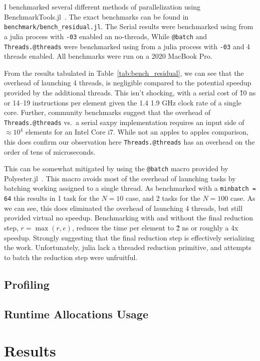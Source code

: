 \documentclass{article}
\begin{document}
I benchmarked several different methods of parallelization using BenchmarkTools.jl~\cite{BenchmarkTools.jl-2016}.
The exact benchmarks can be found in \verb!benchmark/bench_residual.jl!.
The Serial results were benchmarked using from a julia process with \verb!-03! enabled an no-threads, While \verb!@batch! and \verb!Threads.@threads! were benchmarked using from a julia process with \verb!-03! and 4 threads enabled.
All benchmarks were run on a 2020 MacBook Pro.

From the results tabulated in Table~\ref{tab:bench_residual}, we can see that the overhead of launching 4 threads, is negligible compared to the potential speedup provided by the additional threads.
This isn't shocking, with a serial cost of \~10 ns or 14--19 instructions per element given the 1.4 1.9 GHz clock rate of a single core.
Further, community benchmarks suggest that the overhead of \verb!Threads.@threads! vs.\ a serial saxpy implementation requires an input side of \(\approx 10^4\) elements for an Intel Core i7\cite{GccVsThreads2020}.
While not an apples to apples comparison, this does confirm our observation here \verb!Threads.@threads! has an overhead on the order of tens of microseconds.

This can be somewhat mitigated by using the \verb!@batch! macro provided by Polyester.jl~\cite{Polyester2022}.
This macro avoids most of the overhead of launching tasks by batching working assigned to a single thread.
As benchmarked with a \verb!minbatch = 64! this results in 1 task for the \(N = 10\) case, and 2 tasks for the \(N = 100\) case.
As we can see, this does eliminated the overhead of launching 4 threads, but still provided virtual no speedup.
Benchmarking with and without the final reduction step, \( r = \max(r, e) \), reduces the time per element to \~2 ns or roughly a 4x speedup.
Strongly suggesting that the final reduction step is effectively serializing the work.
Unfortunately, julia lack a threaded reduction primitive, and attempts to batch the reduction step were unfruitful.

\subsection{Profiling}

\subsection{Runtime Allocations Usage}\label{sec:runtime_allocations}

\section{Results}
\end{document}
